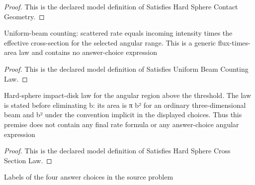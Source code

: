 \begin{proof}
  This is the declared model definition of Satisfies Hard Sphere Contact Geometry.
\end{proof}
\begin{definition}
  \label{def:physics:phyx-mini-0562:phyxminiproblems-problemphyxmini0562-satisfiesuniformbeamcountinglaw}
  Uniform-beam counting: scattered rate equals incoming intensity times the effective cross-section for the selected angular range. This is a generic flux-times-area law and contains no answer-choice expression
\end{definition}
\begin{proof}
  This is the declared model definition of Satisfies Uniform Beam Counting Law.
\end{proof}
\begin{definition}
  \label{def:physics:phyx-mini-0562:phyxminiproblems-problemphyxmini0562-satisfieshardspherecrosssectionlaw}
  Hard-sphere impact-disk law for the angular region above the threshold. The law is stated before eliminating b: its area is π b² for an ordinary three-dimensional beam and b² under the convention implicit in the displayed choices. Thus this premise does not contain any final rate formula or any answer-choice angular expression
\end{definition}
\begin{proof}
  This is the declared model definition of Satisfies Hard Sphere Cross Section Law.
\end{proof}
\begin{definition}
  \label{def:physics:phyx-mini-0562:phyxminiproblems-problemphyxmini0562-answerchoice}
  Labels of the four answer choices in the source problem
\end{definition}
